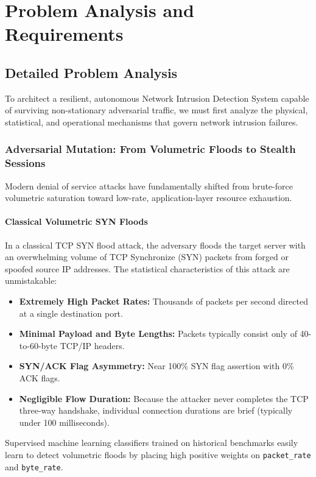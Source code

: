 \documentclass[12pt,a4paper,oneside]{report}
\begin{document}
\chapter{Problem Analysis and Requirements}
\label{chap:requirements}

\section{Detailed Problem Analysis}
To architect a resilient, autonomous Network Intrusion Detection System capable of surviving non-stationary adversarial traffic, we must first analyze the physical, statistical, and operational mechanisms that govern network intrusion failures.

\subsection{Adversarial Mutation: From Volumetric Floods to Stealth Sessions}
Modern denial of service attacks have fundamentally shifted from brute-force volumetric saturation toward low-rate, application-layer resource exhaustion.

\subsubsection{Classical Volumetric SYN Floods}
In a classical TCP SYN flood attack, the adversary floods the target server with an overwhelming volume of TCP Synchronize (SYN) packets from forged or spoofed source IP addresses. The statistical characteristics of this attack are unmistakable:
\begin{itemize}
    \item \textbf{Extremely High Packet Rates:} Thousands of packets per second directed at a single destination port.
    \item \textbf{Minimal Payload and Byte Lengths:} Packets typically consist only of 40-to-60-byte TCP/IP headers.
    \item \textbf{SYN/ACK Flag Asymmetry:} Near 100\% SYN flag assertion with 0\% ACK flags.
    \item \textbf{Negligible Flow Duration:} Because the attacker never completes the TCP three-way handshake, individual connection durations are brief (typically under 100 milliseconds).
\end{itemize}
Supervised machine learning classifiers trained on historical benchmarks easily learn to detect volumetric floods by placing high positive weights on \texttt{packet\_rate} and \texttt{byte\_rate}.
\end{document}
